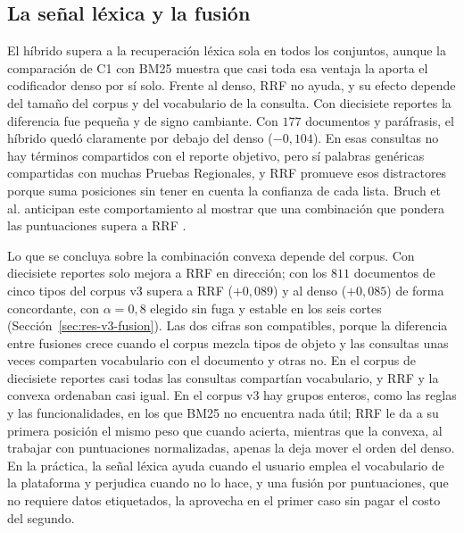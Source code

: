 \documentclass[11pt,letterpaper]{article}
\numberwithin{equation}{section}
\begin{document}
\subsection*{La señal léxica y la fusión}
El híbrido supera a la recuperación léxica sola en todos los conjuntos, aunque la comparación de C1 con BM25 muestra que casi toda esa ventaja la aporta el codificador denso por sí solo. Frente al denso, RRF no ayuda, y su efecto depende del tamaño del corpus y del vocabulario de la consulta. Con diecisiete reportes la diferencia fue pequeña y de signo cambiante. Con $177$ documentos y paráfrasis, el híbrido quedó claramente por debajo del denso ($-0{,}104$). En esas consultas no hay términos compartidos con el reporte objetivo, pero sí palabras genéricas compartidas con muchas Pruebas Regionales, y RRF promueve esos distractores porque suma posiciones sin tener en cuenta la confianza de cada lista. Bruch et al. anticipan este comportamiento al mostrar que una combinación que pondera las puntuaciones supera a RRF \cite{bruch2024fusion}.

Lo que se concluya sobre la combinación convexa depende del corpus. Con diecisiete reportes solo mejora a RRF en dirección; con los $811$ documentos de cinco tipos del corpus v3 supera a RRF ($+0{,}089$) y al denso ($+0{,}085$) de forma concordante, con $\alpha=0{,}8$ elegido sin fuga y estable en los seis cortes (Sección~\ref{sec:res-v3-fusion}). Las dos cifras son compatibles, porque la diferencia entre fusiones crece cuando el corpus mezcla tipos de objeto y las consultas unas veces comparten vocabulario con el documento y otras no. En el corpus de diecisiete reportes casi todas las consultas compartían vocabulario, y RRF y la convexa ordenaban casi igual. En el corpus v3 hay grupos enteros, como las reglas y las funcionalidades, en los que BM25 no encuentra nada útil; RRF le da a su primera posición el mismo peso que cuando acierta, mientras que la convexa, al trabajar con puntuaciones normalizadas, apenas la deja mover el orden del denso. En la práctica, la señal léxica ayuda cuando el usuario emplea el vocabulario de la plataforma y perjudica cuando no lo hace, y una fusión por puntuaciones, que no requiere datos etiquetados, la aprovecha en el primer caso sin pagar el costo del segundo.
\end{document}

